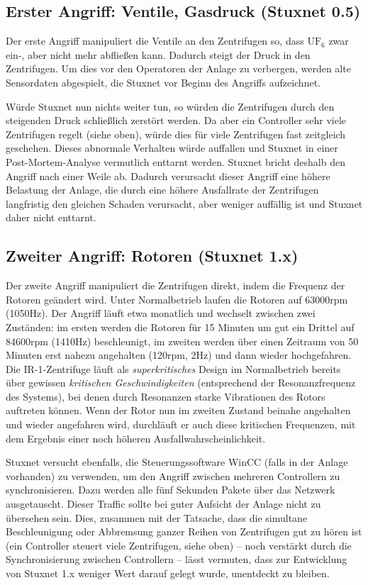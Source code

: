 \documentclass[a4paper]{article}
\begin{document}
\subsection{Erster Angriff: Ventile, Gasdruck (Stuxnet 0.5)}

Der erste Angriff manipuliert die Ventile an den Zentrifugen so,
dass $\mathrm{UF}_6$ zwar ein-, aber nicht mehr abfließen kann.
Dadurch steigt der Druck in den Zentrifugen.
Um dies vor den Operatoren der Anlage zu verbergen,
werden alte Sensordaten abgespielt, die Stuxnet vor Beginn des Angriffs aufzeichnet.

Würde Stuxnet nun nichts weiter tun, so würden die Zentrifugen durch den steigenden Druck schließlich zerstört werden.
Da aber ein Controller sehr viele Zentrifugen regelt (siehe oben), würde dies für viele Zentrifugen fast zeitgleich geschehen.
Dieses abnormale Verhalten würde auffallen und Stuxnet in einer Post-Mortem-Analyse vermutlich enttarnt werden.
Stuxnet bricht deshalb den Angriff nach einer Weile ab.
Dadurch verursacht dieser Angriff eine höhere Belastung der Anlage,
die durch eine höhere Ausfallrate der Zentrifugen langfristig den gleichen Schaden verursacht,
aber weniger auffällig ist und Stuxnet daher nicht enttarnt.

\subsection{Zweiter Angriff: Rotoren (Stuxnet 1.x)}

Der zweite Angriff manipuliert die Zentrifugen direkt, indem die Frequenz der Rotoren geändert wird.
Unter Normalbetrieb laufen die Rotoren auf 63000rpm (1050Hz).
Der Angriff läuft etwa monatlich und wechselt zwischen zwei Zu\-stän\-den:
im ersten werden die Rotoren für 15 Minuten um gut ein Drittel auf 84600rpm (1410Hz) beschleunigt,
im zweiten werden über einen Zeitraum von 50 Minuten erst nahezu angehalten (120rpm, 2Hz) und dann wieder hochgefahren.
Die IR-1-Zentrifuge läuft als \emph{superkritisches} Design im Normalbetrieb bereits über gewissen \emph{kritischen Geschwindigkeiten}
(entsprechend der Resonanzfrequenz des Systems), bei denen durch Resonanzen starke Vibrationen des Rotors auftreten können.
Wenn der Rotor nun im zweiten Zustand beinahe angehalten und wieder angefahren wird,
durchläuft er auch diese kritischen Frequenzen, mit dem Ergebnis einer noch höheren Ausfallwahrscheinlichkeit.

Stuxnet versucht ebenfalls, die Steuerungssoftware WinCC (falls in der Anlage vorhanden) zu verwenden, um den Angriff zwischen mehreren Controllern zu synchronisieren.\cite{dossier}
Dazu werden alle fünf Sekunden Pakete über das Netzwerk ausgetauscht.
Dieser Traffic sollte bei guter Aufsicht der Anlage nicht zu übersehen sein.
Dies, zusammen mit der Tatsache, dass die simultane Beschleunigung oder Abbremsung ganzer Reihen von Zentrifugen gut zu hören ist
(ein Controller steuert viele Zentrifugen, siehe oben) – noch verstärkt durch die Synchronisierung zwischen Controllern –
lässt vermuten, dass zur Entwicklung von Stuxnet 1.x weniger Wert darauf gelegt wurde, unentdeckt zu bleiben.
\end{document}
